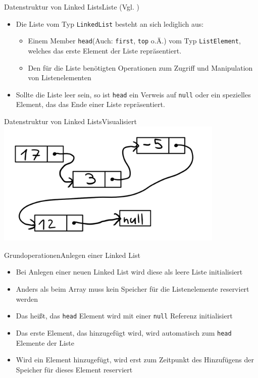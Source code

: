 \begin{frame}{Datenstruktur von Linked Lists}{Liste (Vgl. \cite{fahr:list})}
	\begin{itemize}
		\item Die Liste vom Typ \texttt{LinkedList} besteht an sich lediglich aus:
		\begin{itemize}
			\item Einem Member \texttt{head}(Auch: \texttt{first}, \texttt{top} o.Ä.) vom Typ \texttt{ListElement}, welches das erste Element der Liste repräsentiert.
			\item Den für die Liste benötigten Operationen zum Zugriff und Manipulation von Listenelementen
		\end{itemize}
		\item Sollte die Liste leer sein, so ist \texttt{head} ein Verweis auf \texttt{null} oder ein spezielles Element, das das Ende einer Liste repräsentiert.
	\end{itemize}
\end{frame}

\begin{frame}{Datenstruktur von Linked Lists}{Visualisiert}
\includegraphics[height=6cm]{graph/llist_basic}
\end{frame}

\begin{frame}{Grundoperationen}{Anlegen einer Linked List}
	\begin{itemize}
		\item Bei Anlegen einer neuen Linked List wird diese als leere Liste initialisiert
		\item Anders als beim Array muss kein Speicher für die Listenelemente reserviert werden
		\item Das heißt, das \texttt{head} Element wird mit einer \texttt{null} Referenz initialisiert
		\item Das erste Element, das hinzugefügt wird, wird automatisch zum \texttt{head} Elemente der Liste
		\item Wird ein Element hinzugefügt, wird erst zum Zeitpunkt des Hinzufügens der Speicher für dieses Element reserviert
	\end{itemize}
\end{frame}

